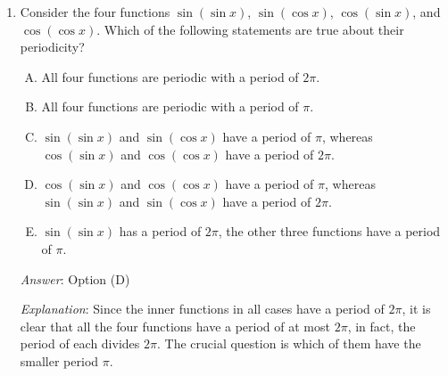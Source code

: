 \documentclass[10pt]{amsart}
\begin{document}
\begin{enumerate}
  {\em Answer}: Option (A).

  {\em Explanation}: The fact that the derivatives of two functions
  agree at integers says nothing about how the derivatives behave
  elsewhere -- they could differ quite a bit at other places. Hence,
  (A) is not necessarily true, and hence must be the right option. All
  the other options are correct as statements and hence cannot be the
  right option. This is because in all of them, the set of points
  where the derivatives agree is {\em dense} -- it intersects every
  open interval. So, continuity forces the functions $F'$ and $G'$ to
  be equal everywhere, forcing $F - G$ to be constant everywhere.

  {\em Performance review}: $6$ out of $12$ got this correct. $5$
  chose (E), $1$ chose (D).

  {\em Historical note (last year)}: $10$ out of $16$ people got this
  correct. $2$ people each chose (B), (D), and (E).

  {\em Historical note (last year, previous quiz)}: Nobody got it
  correct.

  {\em Action point}: It's possible that many of you just
  remembered/revisited the question and saw that the correct answer
  option is (A). However, you should make sure you understand {\em
  why} the correct answer option is (A).
\item Consider the four functions $\sin(\sin x)$, $\sin(\cos x)$,
  $\cos(\sin x)$, and $\cos(\cos x)$. Which of the following
  statements are true about their periodicity?

  \begin{enumerate}[(A)]
  \item All four functions are periodic with a period of $2\pi$.
  \item All four functions are periodic with a period of $\pi$.
  \item $\sin(\sin x)$ and $\sin(\cos x)$ have a period of $\pi$,
    whereas $\cos(\sin x)$ and $\cos(\cos x)$ have a period of $2\pi$.
  \item $\cos(\sin x)$ and $\cos(\cos x)$ have a period of $\pi$,
    whereas $\sin(\sin x)$ and $\sin(\cos x)$ have a period of $2\pi$.
  \item $\sin(\sin x)$ has a period of $2\pi$, the other three
    functions have a period of $\pi$.
  \end{enumerate}

  {\em Answer}: Option (D)

  {\em Explanation}: Since the inner functions in all cases have a
  period of $2\pi$, it is clear that all the four functions have a
  period of at most $2\pi$, in fact, the period of each divides
  $2\pi$. The crucial question is which of them have the smaller
  period $\pi$.


\end{enumerate}
\end{document}
